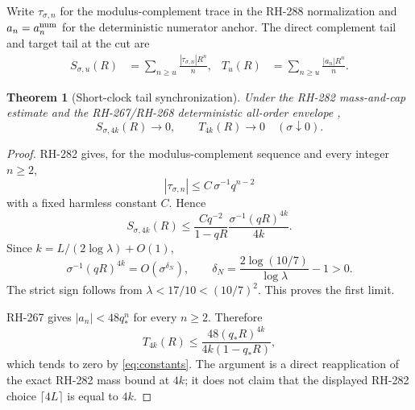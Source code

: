 \documentclass[11pt]{article}
\newtheorem{theorem}{Theorem}[section]
\theoremstyle{remark}
\begin{document}
Write $\tau_{\sigma,n}$ for the modulus-complement trace in the RH-288
normalization and $a_n=a_n^{\rm num}$ for the deterministic numerator anchor.
The direct complement tail and target tail at the cut are
\begin{align}
 S_{\sigma,u}(R)&=\sum_{n\ge u}\frac{|\tau_{\sigma,n}|R^n}{n},
 &T_u(R)&=\sum_{n\ge u}\frac{|a_n|R^n}{n}.
 \label{eq:tails}
\end{align}

\begin{theorem}[Short-clock tail synchronization]
\label{thm:tails}
Under the RH-282 mass-and-cap estimate \citep{WangSpectralTail2026} and the
RH-267/RH-268 deterministic all-order envelope
\citep{WangUnifiedEnvelope2026,WangSharpRadius2026},
\begin{equation}
 S_{\sigma,4k}(R)\longrightarrow0,
 \qquad T_{4k}(R)\longrightarrow0
 \quad (\sigma\downarrow0).
 \label{eq:tail-vanish}
\end{equation}
\end{theorem}

\begin{proof}
RH-282 gives, for the modulus-complement sequence and every integer $n\ge2$,
\begin{equation}
 |\tau_{\sigma,n}|\le C\,\sigma^{-1}q^{n-2}
 \label{eq:mass-cap}
\end{equation}
with a fixed harmless constant $C$.  Hence
\begin{equation}
 S_{\sigma,4k}(R)
 \le \frac{Cq^{-2}}{1-qR}
 \frac{\sigma^{-1}(qR)^{4k}}{4k}.
 \label{eq:noisy-bound}
\end{equation}
Since $k=L/(2\log\lambda)+O(1)$,
\begin{equation}
 \sigma^{-1}(qR)^{4k}
 =O\!\left(\sigma^{\delta_N}\right),
 \qquad
 \delta_N=\frac{2\log(10/7)}{\log\lambda}-1>0.
 \label{eq:noisy-exponent}
\end{equation}
The strict sign follows from $\lambda<17/10<(10/7)^2$.  This proves the
first limit.

RH-267 gives $|a_n|<48q_*^n$ for every $n\ge2$.  Therefore
\begin{equation}
 T_{4k}(R)
 \le \frac{48(q_*R)^{4k}}{4k(1-q_*R)},
 \label{eq:target-bound}
\end{equation}
which tends to zero by \eqref{eq:constants}.  The argument is a direct
reapplication of the exact RH-282 mass bound at $4k$; it does not claim that
the displayed RH-282 choice $\lceil4L\rceil$ is equal to $4k$.
\end{proof}
\end{document}
